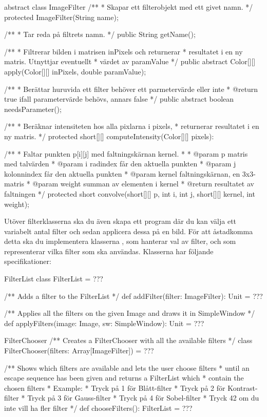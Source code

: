 \begin{JavaSpec}{abstract class ImageFilter}
/**
 * Skapar ett filterobjekt med ett givet namn.
 */
protected ImageFilter(String name);

/**
 * Tar reda på filtrets namn.
 */
public String getName();

/**
 * Filtrerar bilden i matrisen inPixels och returnerar
 * resultatet i en ny matris. Utnyttjar eventuellt 
 * värdet av paramValue
 */
public abstract Color[][] apply(Color[][] inPixels,
				 double paramValue);

/**
 * Berättar huruvida ett filter behöver ett parmetervärde eller inte
 * @return true ifall parametervärde behövs, annars false
 */
public abstract boolean needsParameter();

/**
 * Beräknar intensiteten hos alla pixlarna i pixels,
 * returnerar resultatet i en ny matris.
 */
protected short[][] computeIntensity(Color[][] pixels):

/**
 * Faltar punkten p[i][j] med faltningskärnan kernel.
 * 
 * @param p 		matris med talvärden
 * @param i 		radindex får den aktuella punkten
 * @param j 		kolonnindex får den aktuella punkten
 * @param kernel	faltningskärnan, en 3x3-matris
 * @param weight	summan av elementen i kernel
 * @return 		resultatet av faltningen
 */
protected short convolve(short[][] p, int i, int j, 
			short[][] kernel, int weight);
\end{JavaSpec}

Utöver filterklasserna ska du även skapa ett program där du kan välja ett variabelt antal filter och sedan applicera dessa på en bild. För att åstadkomma detta ska du implementera klasserna , som hanterar val av filter, och  som representerar vilka filter som ska användas. Klasserna har följande specifikationer:

\begin{ScalaSpec}{FilterList}
class FilterList = ???

/** Adds a filter to the FilterList */
def addFilter(filter: ImageFilter): Unit = ???
  
/** Applies all the filters on the given Image and draws it in SimpleWindow */
def applyFilters(image: Image, sw: SimpleWindow): Unit = ???
\end{ScalaSpec}

\begin{ScalaSpec}{FilterChooser}
/** Creates a FilterChooser with all the available filters */
class FilterChooser(filters: Array[ImageFilter]) = ???
  
/** Shows which filters are available and lets the user choose filters
*   until an escape sequence has been given and returns a FilterList which
*   contain the chosen filters
*   Example: 
*   Tryck på 1 för Blått-filter
*   Tryck på 2 för Kontrast-filter
*   Tryck på 3 för Gauss-filter
*   Tryck på 4 för Sobel-filter
*   Tryck 42 om du inte vill ha fler filter
*/
def chooseFilters(): FilterList = ???
\end{ScalaSpec}

